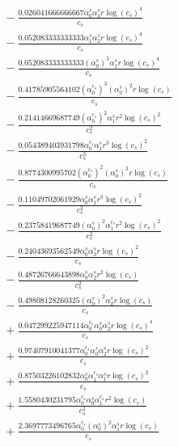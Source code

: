 \documentclass[10pt]{article}
\begin{document}
\begin{align*}
&{}  - \frac{0.026041666666667 \alpha_{0}^s \alpha_{3}^s r \log{\left(c_{s} \right)}^{4}}{c_{s}} \\
&{}  - \frac{0.052083333333333 \alpha_{1}^s \alpha_{2}^s r \log{\left(c_{s} \right)}^{4}}{c_{s}} \\
&{}  - \frac{0.052083333333333 \left(\alpha_{0}^s\right)^{3} \alpha_{1}^s r \log{\left(c_{s} \right)}^{4}}{c_{s}} \\
&{}  - \frac{0.41785905564102 \left(\alpha_{0}^{c_s}\right)^{3} \left(\alpha_{0}^s\right)^{2} r \log{\left(c_{s} \right)}}{c_{s}} \\
&{}  - \frac{0.21414669687749 \left(\alpha_{0}^{c_s}\right)^{2} \alpha_{1}^s r^{2} \log{\left(c_{s} \right)}^{2}}{c_{s}^{2}} \\
&{}  - \frac{0.054389403931798 \alpha_{0}^{c_s} \alpha_{1}^s r^{3} \log{\left(c_{s} \right)}^{2}}{c_{s}^{3}} \\
&{}  - \frac{0.8774300995702 \left(\alpha_{0}^{c_s}\right)^{2} \left(\alpha_{0}^s\right)^{3} r \log{\left(c_{s} \right)}}{c_{s}} \\
&{}  - \frac{0.11049702061929 \alpha_{0}^s \alpha_{1}^s r^{3} \log{\left(c_{s} \right)}^{2}}{c_{s}^{3}} \\
&{}  - \frac{0.23758419687749 \left(\alpha_{0}^s\right)^{2} \alpha_{1}^{c_s} r^{2} \log{\left(c_{s} \right)}^{2}}{c_{s}^{2}} \\
&{}  - \frac{0.24043693562549 \alpha_{0}^s \alpha_{3}^s r \log{\left(c_{s} \right)}^{2}}{c_{s}} \\
&{}  - \frac{0.48726766643898 \alpha_{0}^s \alpha_{2}^s r^{2} \log{\left(c_{s} \right)}}{c_{s}^{2}} \\
&{}  - \frac{0.49808128260325 \left(\alpha_{0}^s\right)^{2} \alpha_{2}^s r \log{\left(c_{s} \right)}}{c_{s}} \\
&{}  + \frac{0.047299225947114 \alpha_{0}^{c_s} \alpha_{0}^s \alpha_{2}^s r \log{\left(c_{s} \right)}^{4}}{c_{s}} \\
&{}  + \frac{0.97407910041377 \alpha_{0}^{c_s} \alpha_{0}^s \alpha_{2}^s r \log{\left(c_{s} \right)}^{2}}{c_{s}} \\
&{}  + \frac{0.87503226102832 \alpha_{0}^s \alpha_{1}^{c_s} \alpha_{1}^s r \log{\left(c_{s} \right)}^{2}}{c_{s}} \\
&{}  + \frac{1.5580430231795 \alpha_{0}^{c_s} \alpha_{0}^s \alpha_{1}^{c_s} r^{2} \log{\left(c_{s} \right)}}{c_{s}^{2}} \\
&{}  + \frac{2.3697773496765 \alpha_{0}^{c_s} \left(\alpha_{0}^s\right)^{2} \alpha_{1}^s r \log{\left(c_{s} \right)}}{c_{s}} \\

\end{align*}
\end{document}
